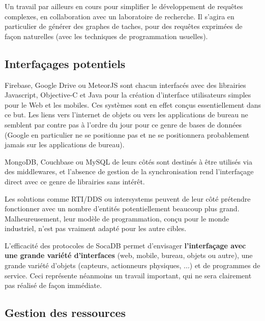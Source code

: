 \documentclass[a4paper,10pt]{scrreprt}
\begin{document}
            
            \medskip
            Un travail par ailleurs en cours pour simplifier le développement de requêtes complexes, en collaboration avec un laboratoire de recherche. Il s'agira en particulier de générer des graphes de taches, pour des requêtes exprimées de façon naturelles (avec les techniques de programmation usuelles). %
        
        \subsection{Interfaçages potentiels}
        
            Firebase, Google Drive ou MeteorJS sont chacun interfacés avec des librairies Javascript, Objective-C et Java pour la création d'interface utilisateurs simples pour le Web et les mobiles. Ces systèmes sont en effet conçus essentiellement dans ce but. Les liens vers l'internet de objets ou vers les applications de bureau ne semblent par contre pas à l'ordre du jour pour ce genre de bases de données (Google en particulier ne se positionne pas et ne se positionnera probablement jamais sur les applications de bureau).
            
            MongoDB, Couchbase ou MySQL de leurs côtés sont destinés à être utilisés via des middlewares, et l'absence de gestion de la synchronisation rend l'interfaçage direct avec ce genre de librairies sans intérêt.
        
            Les solutions comme RTI/DDS ou intersystems peuvent de leur côté prétendre fonctionner avec un nombre d'entités potentiellement beaucoup plus grand. Malheureusement, leur modèle de programmation, conçu pour le monde industriel, n'est pas vraiment adapté pour les autre cibles.
        
            \medskip
            L'efficacité des protocoles de SocaDB permet d'envisager \textbf{l'interfaçage avec une grande variété d'interfaces} (web, mobile, bureau, objets ou autre), une grande variété d'objets (capteurs, actionneurs physiques, ...) et de programmes de service. Ceci représente néanmoins un travail important, qui ne sera clairement pas réalisé de façon immédiate.
            
        \subsection{Gestion des ressources}
\end{document}
